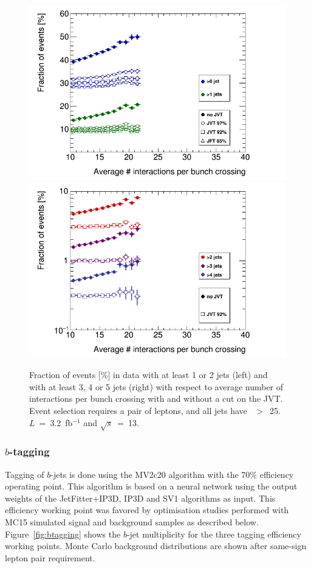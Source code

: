 \begin{figure}[h!]
\begin{center}
\includegraphics[trim=0.0cm 0cm 0cm 0cm,width=0.47\columnwidth]{FIGURES/Frac_njets_1and2}
\includegraphics[trim=0.0cm 0cm 0cm 0cm,width=0.47\columnwidth]{FIGURES/Frac_njets_3to5}
\vspace{-0.2cm}
\end{center}
\caption{Fraction of events [\%] in data with at least 1 or 2 jets (left) and with at least 3, 4 or 5 jets (right) with respect to average number of interactions per bunch crossing with and without a cut on the JVT. Event selection requires a pair of leptons, and all jets have \pt~$>$~25\GeV. $L$~=~3.2~fb$^{-1}$ and $\sqrt s$~=~13\TeV.}
\label{Figure:JVF_Dependency_Run2} 
\end{figure}

\subsubsection{$b$-tagging}

Tagging of $b$-jets is done using the MV2c20 algorithm with the 70\% efficiency 
operating point. This algorithm is based on a neural network using 
the output weights of the JetFitter+IP3D, IP3D and SV1 algorithms as input.
This efficiency working point was favored by optimisation studies performed with MC15 simulated signal and background samples as described below.
Figure~\ref{fig:btagging} shows the $b$-jet multiplicity for the three tagging efficiency working points. 
Monte Carlo background distributions are shown after same-sign lepton pair requirement.

